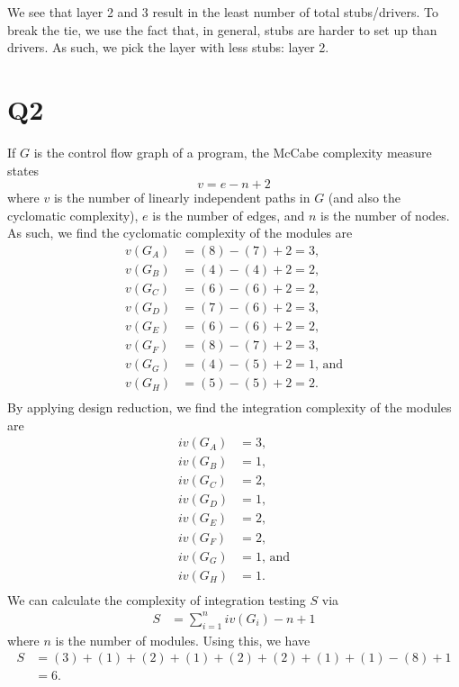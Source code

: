 \documentclass[12pt, letterpaper, titlepage]{article}
\begin{document}
We see that layer 2 and 3 result in the least number of total stubs/drivers. To break the tie, we use the fact that, in general, stubs are harder to set up than drivers. As such, we pick the layer with less stubs: layer 2.

\section*{Q2}
If $G$ is the control flow graph of a program, the McCabe complexity measure states
\begin{equation}
    v = e - n + 2
\end{equation}
where $v$ is the number of linearly independent paths in $G$ (and also the cyclomatic complexity), $e$ is the number of edges, and $n$ is the number of nodes. As such, we find the cyclomatic complexity of the modules are 
\begin{align}
    v(G_A) &= (8) - (7) + 2 = 3, \\
    v(G_B) &= (4) - (4) + 2 = 2, \\
    v(G_C) &= (6) - (6) + 2 = 2, \\
    v(G_D) &= (7) - (6) + 2 = 3, \\
    v(G_E) &= (6) - (6) + 2 = 2, \\
    v(G_F) &= (8) - (7) + 2 = 3, \\
    v(G_G) &= (4) - (5) + 2 = 1 \text{, and} \\
    v(G_H) &= (5) - (5) + 2 = 2. \\
\end{align}
By applying design reduction, we find the integration complexity of the modules are
\begin{align}
    iv(G_A) &= 3, \\
    iv(G_B) &= 1, \\
    iv(G_C) &= 2, \\
    iv(G_D) &= 1, \\
    iv(G_E) &= 2, \\
    iv(G_F) &= 2, \\
    iv(G_G) &= 1 \text{, and} \\
    iv(G_H) &= 1. \\
\end{align}
We can calculate the complexity of integration testing $S$ via
\begin{align}
    S &= \sum_{i=1}^n iv(G_i) - n + 1
\end{align}
where $n$ is the number of modules. Using this, we have
\begin{align}
    S &= (3) + (1) + (2) + (1) + (2) + (2) + (1) + (1) - (8) + 1 \\
    &= 6.
\end{align}
\end{document}
